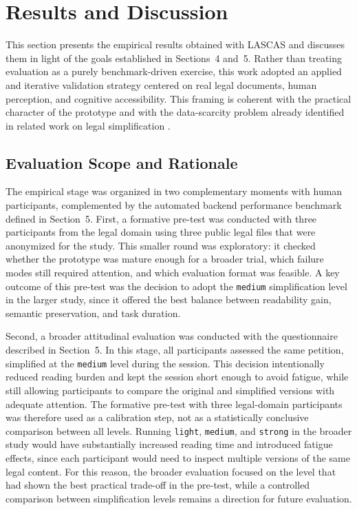 \documentclass[english]{UNISINOSartigo} %
\begin{document}
\section{Results and Discussion}

This section presents the empirical results obtained with LASCAS and discusses them in light of the goals established in Sections~4 and~5. Rather than treating evaluation as a purely benchmark-driven exercise, this work adopted an applied and iterative validation strategy centered on real legal documents, human perception, and cognitive accessibility. This framing is coherent with the practical character of the prototype and with the data-scarcity problem already identified in related work on legal simplification \cite{garimella2022insights, alves2023automatic, athugodage2024transfer}.

\subsection{Evaluation Scope and Rationale}

The empirical stage was organized in two complementary moments with human participants, complemented by the automated backend performance benchmark defined in Section~5. First, a formative pre-test was conducted with three participants from the legal domain using three public legal files that were anonymized for the study. This smaller round was exploratory: it checked whether the prototype was mature enough for a broader trial, which failure modes still required attention, and which evaluation format was feasible. A key outcome of this pre-test was the decision to adopt the \texttt{medium} simplification level in the larger study, since it offered the best balance between readability gain, semantic preservation, and task duration.

Second, a broader attitudinal evaluation was conducted with the questionnaire described in Section~5. In this stage, all participants assessed the same petition, simplified at the \texttt{medium} level during the session. This decision intentionally reduced reading burden and kept the session short enough to avoid fatigue, while still allowing participants to compare the original and simplified versions with adequate attention. The formative pre-test with three legal-domain participants was therefore used as a calibration step, not as a statistically conclusive comparison between all levels. Running \texttt{light}, \texttt{medium}, and \texttt{strong} in the broader study would have substantially increased reading time and introduced fatigue effects, since each participant would need to inspect multiple versions of the same legal content. For this reason, the broader evaluation focused on the level that had shown the best practical trade-off in the pre-test, while a controlled comparison between simplification levels remains a direction for future evaluation.
\end{document}
